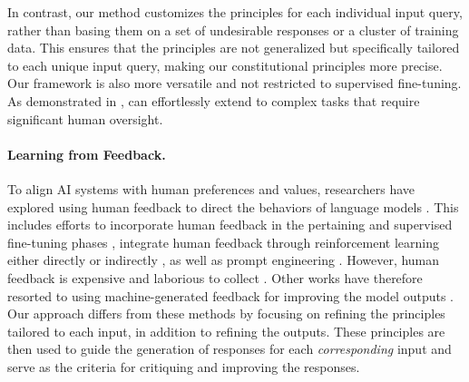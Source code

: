In contrast, our method customizes the principles for each individual input query, rather than basing them on a set of undesirable responses or a cluster of training data. This ensures that the principles are not generalized but specifically tailored to each unique input query, making our constitutional principles more precise. Our framework is also more versatile and not restricted to supervised fine-tuning. As demonstrated in , \ourframework{} can effortlessly extend to complex tasks that require significant human oversight.

\paragraph{Learning from Feedback.} To align AI systems with human preferences and values, researchers have explored using human feedback to direct the behaviors of language models \cite{kirk-etal-2023-past}. This includes efforts to incorporate human feedback in the pertaining \cite{korbak2023pretraining} and supervised fine-tuning phases \cite{hancock-etal-2019-learning, liu2024chain}, integrate human feedback through reinforcement learning either directly \cite{stiennon2020learning, bai2022traininghelpfulharmlessassistant, bakker2022fine, ouyang2022training, liu2022second} or indirectly \cite{zhou2021narle, korbak2023pretraining}, as well as prompt engineering \cite{jin2022make, zhao-etal-2021-ethical, askell2021generallanguageassistantlaboratory}. However, human feedback is expensive and laborious to collect \cite{Lee2024RLAIFVR}. Other works have therefore resorted to using machine-generated feedback for improving the model outputs \cite{bai2022constitutional, yang-etal-2022-re3, Lee2024RLAIFVR, fu-etal-2024-gptscore, cui2024ultrafeedback, madaan2023selfrefine}. Our approach differs from these methods by focusing on refining the principles tailored to each input, in addition to refining the outputs. These principles are then used to guide the generation of responses for each \emph{corresponding} input and serve as the criteria for critiquing and improving the responses.